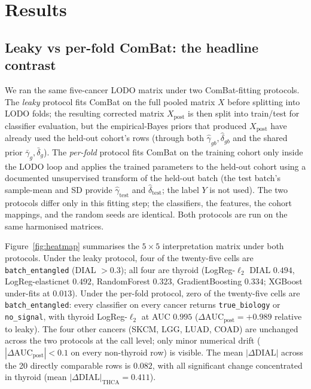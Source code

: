 \documentclass[11pt,a4paper]{article}
\begin{document}
\section{Results}
\label{sec:results}

\subsection{Leaky vs per-fold ComBat: the headline contrast}
\label{sec:results-xcancer}
We ran the same five-cancer LODO matrix under two ComBat-fitting
protocols. The \emph{leaky} protocol fits ComBat on the full pooled
matrix $X$ before splitting into LODO folds; the resulting corrected
matrix $X_{\mathrm{post}}$ is then split into train/test for
classifier evaluation, but the empirical-Bayes priors that produced
$X_{\mathrm{post}}$ have already used the held-out cohort's rows
(through both $\hat\gamma_{gb}, \hat\delta_{gb}$ and the shared prior
$\bar\gamma_g, \bar\delta_g$). The \emph{per-fold} protocol fits
ComBat on the training cohort only inside the LODO loop and applies
the trained parameters to the held-out cohort using a documented
unsupervised transform of the held-out batch (the test batch's
sample-mean and SD provide $\hat\gamma_{\mathrm{test}}$ and
$\hat\delta_{\mathrm{test}}$; the label $Y$ is not used). The two
protocols differ only in this fitting step; the classifiers, the
features, the cohort mappings, and the random seeds are identical.
Both protocols are run on the same harmonised matrices.

Figure~\ref{fig:heatmap} summarises the $5 \times 5$ interpretation
matrix under both protocols. Under the leaky protocol, four of the
twenty-five cells are \texttt{batch\_entangled} (DIAL $> 0.3$); all
four are thyroid (LogReg-$\ell_2$ DIAL $0.494$, LogReg-elasticnet
$0.492$, RandomForest $0.323$, GradientBoosting $0.334$; XGBoost
under-fits at $0.013$). Under the per-fold protocol, zero of the
twenty-five cells are \texttt{batch\_entangled}: every classifier on
every cancer returns \texttt{true\_biology} or \texttt{no\_signal},
with thyroid LogReg-$\ell_2$ at AUC $0.995$
($\Delta\mathrm{AUC}_{\mathrm{post}} = +0.989$ relative to leaky).
The four other cancers (SKCM, LGG, LUAD, COAD) are unchanged across
the two protocols at the call level; only minor numerical drift
($|\Delta\mathrm{AUC}_{\mathrm{post}}| < 0.1$ on every non-thyroid row)
is visible. The mean $|\Delta\mathrm{DIAL}|$ across the 20 directly
comparable rows is $0.082$, with all significant change concentrated
in thyroid (mean $|\Delta\mathrm{DIAL}|_{\mathrm{THCA}} = 0.411$).
\end{document}
